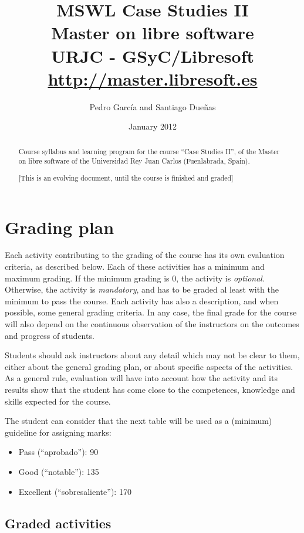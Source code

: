 \documentclass[a4paper]{article}
\title{MSWL Case Studies II \\
Master on libre software \\
URJC - GSyC/Libresoft \\
\url{http://master.libresoft.es}}
\author{Pedro García and Santiago Dueñas}
\date{January 2012}
\begin{document}
\maketitle

\begin{abstract}
Course syllabus and learning program for the course ``Case Studies II'', 
of the Master on libre software of the Universidad Rey Juan Carlos (Fuenlabrada, Spain).

[This is an evolving document, until the course is finished and graded]
\end{abstract}

\tableofcontents

\section{Grading plan}

Each activity contributing to the grading of the course has its own evaluation criteria, 
as described below. Each of these activities has a minimum and maximum grading. If the 
minimum grading is 0, the activity is \textit{optional}. Otherwise, the activity is \textit{mandatory}, and 
has to be graded al least with the minimum to pass the course. Each activity has also a 
description, and when possible, some general grading criteria. In any case, the final grade 
for the course will also depend on the continuous observation of the instructors on the 
outcomes and progress of students.

Students should ask instructors about any detail which may not be clear to them, 
either about the general grading plan, or about specific aspects of the activities. 
As a general rule, evaluation will have into account how the activity and its results 
show that the student has come close to the competences, knowledge and skills expected 
for the course.

The student can consider that the next table will be used as a (minimum) guideline for 
assigning marks:

\begin{itemize}
\item Pass (``aprobado''): 90
\item Good (``notable''): 135
\item Excellent (``sobresaliente''): 170
\end{itemize}

\subsection{Graded activities}
\end{document}
